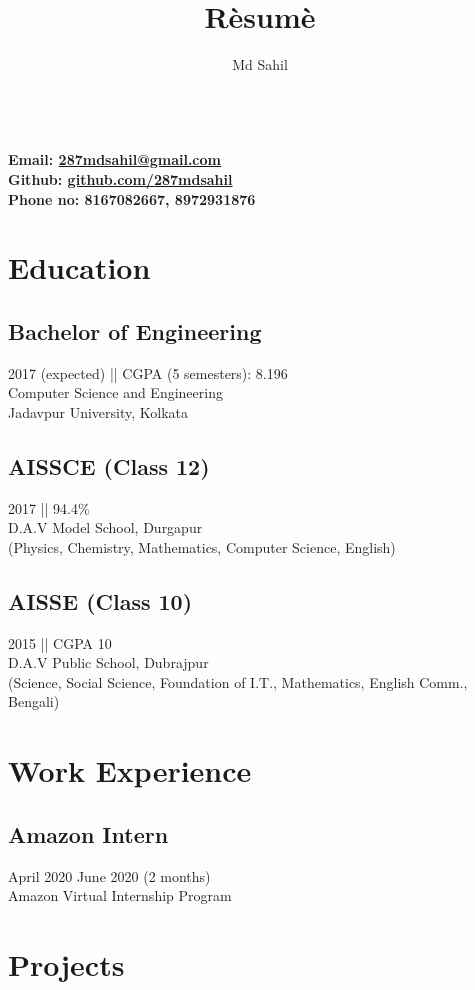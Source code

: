\documentclass{article}
\title{R\`esum\`e}
\author{Md Sahil} \date{}
\makeatletter
\renewcommand{\maketitle}{
\begin{center}
{\Huge\bfseries\theauthor}\\
\vspace{0.5em}
{\large\bfseries Email: \href{287mdsahil@gmail.com}{287mdsahil@gmail.com}}\\
\vspace{0.5em}
{\large\bfseries Github: \href{https://github.com/287mdsahil}{github.com/287mdsahil}}\\
\vspace{0.5em}
{\large\bfseries Phone no: 8167082667, 8972931876}\\
\end{center}
}
\makeatother
\begin{document}
{\maketitle} 

\section{Education} 

\subsection{Bachelor of Engineering}
2017 (expected) || CGPA (5 semesters): 8.196\\
Computer Science and Engineering\\
Jadavpur University, Kolkata\\

\subsection{AISSCE (Class 12)}
2017 || 94.4\%\\
D.A.V Model School, Durgapur\\
(Physics, Chemistry, Mathematics, Computer Science, English)\\

\subsection{AISSE (Class 10)}
2015 || CGPA 10\\
D.A.V Public School, Dubrajpur\\
(Science, Social Science, Foundation of I.T., Mathematics, English Comm., Bengali)\\


\section{Work Experience}
\subsection{Amazon Intern}
April 2020 \- June 2020 (2 months)\\
Amazon Virtual Internship Program


\section{Projects} 
\end{document}
